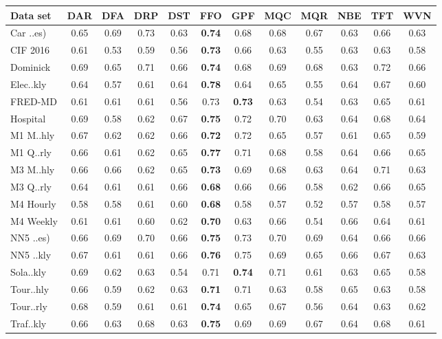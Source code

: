 
    \begin{tabular}{l|ccccccccccc}
        \toprule 
        Data set & DAR & DFA & DRP & DST & FFO & GPF & MQC & MQR & NBE & TFT & WVN \\
        \midrule
        Car ..es) & 0.65 & 0.69 & 0.73 & 0.63 & \textbf{0.74} & 0.68 & 0.68 & 0.67 & 0.63 & 0.66 & 0.63 \\
        CIF 2016 & 0.61 & 0.53 & 0.59 & 0.56 & \textbf{0.73} & 0.66 & 0.63 & 0.55 & 0.63 & 0.63 & 0.58 \\
        Dominick & 0.69 & 0.65 & 0.71 & 0.66 & \textbf{0.74} & 0.68 & 0.69 & 0.68 & 0.63 & 0.72 & 0.66 \\
        Elec..kly & 0.64 & 0.57 & 0.61 & 0.64 & \textbf{0.78} & 0.64 & 0.65 & 0.55 & 0.64 & 0.67 & 0.60 \\
        FRED-MD & 0.61 & 0.61 & 0.61 & 0.56 & 0.73 & \textbf{0.73} & 0.63 & 0.54 & 0.63 & 0.65 & 0.61 \\
        Hospital & 0.69 & 0.58 & 0.62 & 0.67 & \textbf{0.75} & 0.72 & 0.70 & 0.63 & 0.64 & 0.68 & 0.64 \\
        M1 M..hly & 0.67 & 0.62 & 0.62 & 0.66 & \textbf{0.72} & 0.72 & 0.65 & 0.57 & 0.61 & 0.65 & 0.59 \\
        M1 Q..rly & 0.66 & 0.61 & 0.62 & 0.65 & \textbf{0.77} & 0.71 & 0.68 & 0.58 & 0.64 & 0.66 & 0.65 \\
        M3 M..hly & 0.66 & 0.66 & 0.62 & 0.65 & \textbf{0.73} & 0.69 & 0.68 & 0.63 & 0.64 & 0.71 & 0.63 \\
        M3 Q..rly & 0.64 & 0.61 & 0.61 & 0.66 & \textbf{0.68} & 0.66 & 0.66 & 0.58 & 0.62 & 0.66 & 0.65 \\
        M4 Hourly & 0.58 & 0.58 & 0.61 & 0.60 & \textbf{0.68} & 0.58 & 0.57 & 0.52 & 0.57 & 0.58 & 0.57 \\
        M4 Weekly & 0.61 & 0.61 & 0.60 & 0.62 & \textbf{0.70} & 0.63 & 0.66 & 0.54 & 0.66 & 0.64 & 0.61 \\
        NN5 ..es) & 0.66 & 0.69 & 0.70 & 0.66 & \textbf{0.75} & 0.73 & 0.70 & 0.69 & 0.64 & 0.66 & 0.66 \\
        NN5 ..kly & 0.67 & 0.61 & 0.61 & 0.66 & \textbf{0.76} & 0.75 & 0.69 & 0.65 & 0.66 & 0.67 & 0.63 \\
        Sola..kly & 0.69 & 0.62 & 0.63 & 0.54 & 0.71 & \textbf{0.74} & 0.71 & 0.61 & 0.63 & 0.65 & 0.58 \\
        Tour..hly & 0.66 & 0.59 & 0.62 & 0.63 & \textbf{0.71} & 0.71 & 0.63 & 0.58 & 0.65 & 0.63 & 0.58 \\
        Tour..rly & 0.68 & 0.59 & 0.61 & 0.61 & \textbf{0.74} & 0.65 & 0.67 & 0.56 & 0.64 & 0.63 & 0.62 \\
        Traf..kly & 0.66 & 0.63 & 0.68 & 0.63 & \textbf{0.75} & 0.69 & 0.69 & 0.67 & 0.64 & 0.68 & 0.61 \\
        \bottomrule
    \end{tabular}